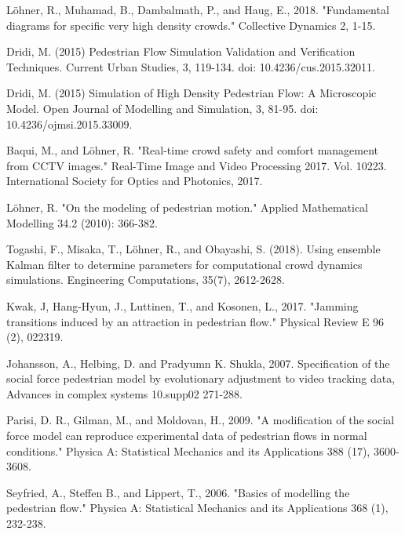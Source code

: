 \documentclass[preprint,12pt]{elsarticle}
\begin{document}
\begin{thebibliography}{10}
L\"ohner, R., Muhamad, B., Dambalmath, P., and Haug, E., 2018. 
"Fundamental diagrams for specific very high density crowds." Collective 
Dynamics 2, 1-15.
{}

Dridi, M. (2015) Pedestrian Flow Simulation Validation and
Verification Techniques. Current Urban Studies, 3, 119-134.
doi: 10.4236/cus.2015.32011.

Dridi, M. (2015) Simulation of High Density Pedestrian Flow:
A Microscopic Model. Open Journal of Modelling and Simulation,
3, 81-95. doi: 10.4236/ojmsi.2015.33009.

Baqui, M., and L\"ohner, R. "Real-time crowd safety
and comfort management from CCTV images." Real-Time Image and Video Processing 2017.
Vol. 10223. International Society for Optics and Photonics, 2017.

L\"ohner, R. "On the modeling of pedestrian motion." 
Applied Mathematical Modelling 34.2 (2010): 366-382.

Togashi, F., Misaka, T., L\"ohner, R., and Obayashi, S. (2018). 
Using ensemble Kalman filter to determine parameters for computational crowd dynamics simulations. 
Engineering Computations, 35(7), 2612-2628.

Kwak, J, Hang-Hyun, J., Luttinen, T., and Kosonen, L., 2017. "Jamming 
transitions induced by an attraction in pedestrian flow." Physical Review E 96 
(2), 022319.
{}

Johansson, A., Helbing, D. and Pradyumn K. Shukla, 2007. Specification of 
the social force pedestrian model by evolutionary adjustment to video tracking 
data, Advances in complex systems 10.supp02 271-288. 
{}

Parisi, D. R., Gilman, M., and Moldovan, H., 2009. "A modification of the 
social force model can reproduce experimental data of pedestrian flows in 
normal 
conditions." Physica A: Statistical Mechanics and its Applications 388 
(17), 3600-3608.
{}

Seyfried, A., Steffen B., and Lippert, T., 2006. "Basics of modelling the 
pedestrian flow." Physica A: Statistical Mechanics and its Applications 368 
(1), 232-238.
{}


\end{thebibliography}
\end{document}
